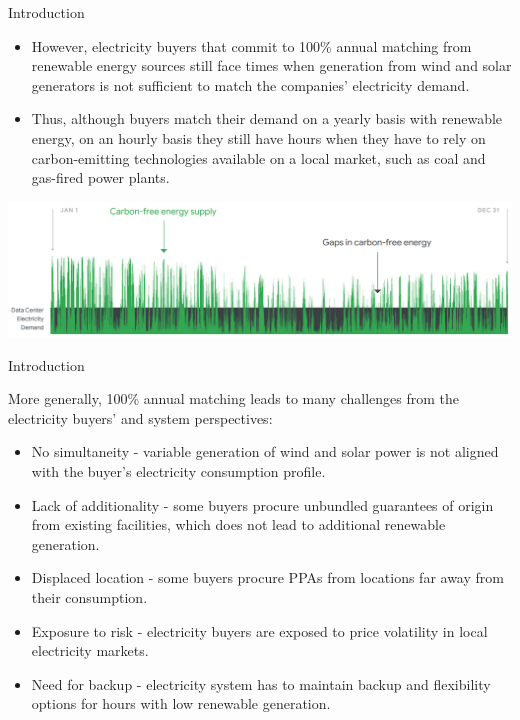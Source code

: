 \begin{frame}{Introduction}
  
    \begin{itemize}
    \item However, electricity buyers that commit to 100\% annual matching 
    from renewable energy sources still face times when generation 
    from wind and solar generators is not sufficient to match 
    the companies’ electricity demand. 
    \item Thus, although buyers match their demand on a \alert{yearly} basis with 
    renewable energy, on an \alert{hourly} basis they still have hours 
    when they have to rely on carbon-emitting technologies available 
    on a local market, such as coal and gas-fired power plants.
    \end{itemize}

  \centering
  \includegraphics[width=14cm]{images/google-year.png}
           
\end{frame}



\begin{frame}{Introduction}
  
  More generally, 100\% annual matching leads to many challenges 
  from the electricity buyers' and system perspectives: 
  \begin{itemize}
  \item No \alert{simultaneity} - variable generation of wind and solar power is not aligned with the 
  buyer’s electricity consumption profile.
  \item Lack of \alert{additionality} - some buyers procure unbundled guarantees of origin from existing 
  facilities, which does not lead to additional renewable generation.
  \item Displaced \alert{location} - some buyers procure  PPAs from locations far away from their consumption.
  \item Exposure to \alert{risk} - electricity buyers are exposed to price volatility 
  in local electricity markets.
  \item Need for \alert{backup} - electricity system has to maintain backup and flexibility options 
  for hours with low renewable generation.
  \end{itemize}
  
\end{frame}



